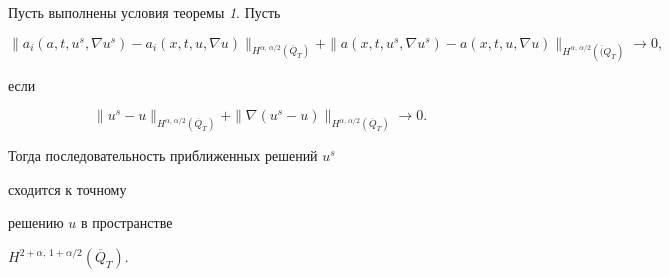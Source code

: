 \begin{thm}


Пусть выполнены условия теоремы {\em 1}. Пусть


$$


\|a_i(a,t,u^s,\nabla u^s)-a_i(x,t,u,\nabla u)


\|_{H^{\alpha,\,\alpha/2}(\overline Q_T)}+


\|a(x,t,u^s,\nabla u^s)-a(x,t,u,\nabla u)


\|_{H^{\alpha,\,\alpha/2}(\overline(Q_T)}\to 0,


$$


если


$$


\|u^s-u\|_{H^{\alpha,\,\alpha/2}(\overline Q_T)}+


\|\nabla(u^s-u)\|_{H^{\alpha,\,\alpha/2}(\overline Q_T)}\to 0.


$$


Тогда последовательность приближенных решений $u^s$


сходится к точному


решению $u$ в пространстве


$H^{2+\alpha,\,1+\alpha/2}(\overline Q_T)$.


\end{thm}





